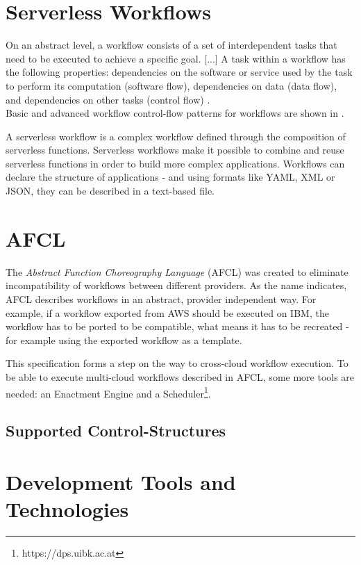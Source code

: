 \documentclass[a4paper,12pt,pdftex,halfparskip,cleardoubleempty,bibtotoc,liststotoc]{scrbook}
\begin{document}
\section{Serverless Workflows}
On an abstract level, a workflow consists of a set of interdependent tasks that need to be executed to achieve a specific goal. [...] A task within a workflow has the following properties: dependencies on the software or service used by the task to perform its computation (software flow), dependencies on data (data flow), and dependencies on other tasks (control flow) \cite{thesis-design-serverless-worfklow-system-eyk}.\\
Basic and advanced workflow control-flow patterns for workflows are shown in \cite{reports-workflow-control-patterns-russell}.

A serverless workflow is a complex workflow defined through the composition of serverless functions. Serverless workflows make it possible to combine and reuse serverless functions in order to build more complex applications. 
Workflows can declare the structure of applications - and using formats like YAML, XML or JSON, they can be described in a text-based file.

\section{AFCL}

The \emph{Abstract Function Choreography Language} (AFCL) was created to eliminate incompatibility of workflows between different providers. As the name indicates, AFCL describes workflows in an abstract, provider independent way. For example, if a workflow exported from AWS should be executed on IBM, the workflow has to be ported to be compatible, what means it has to be recreated - for example using the exported workflow as a template.

This specification forms a step on the way to cross-cloud workflow execution. To be able to execute multi-cloud workflows described in AFCL, some more tools are needed: an Enactment Engine and a Scheduler\footnote{https://dps.uibk.ac.at}.

\subsection{Supported Control-Structures}

\section{Development Tools and Technologies}
\end{document}
